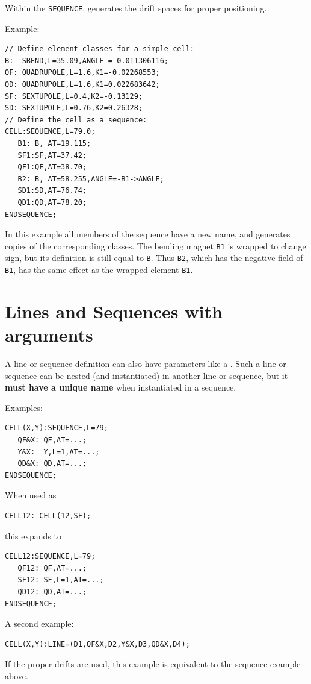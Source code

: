 Within the \texttt{SEQUENCE}, 
\opal generates the drift spaces for proper positioning.

Example:
\begin{verbatim}
// Define element classes for a simple cell:
B:  SBEND,L=35.09,ANGLE = 0.011306116;
QF: QUADRUPOLE,L=1.6,K1=-0.02268553;
QD: QUADRUPOLE,L=1.6,K1=0.022683642;
SF: SEXTUPOLE,L=0.4,K2=-0.13129;
SD: SEXTUPOLE,L=0.76,K2=0.26328;
// Define the cell as a sequence:
CELL:SEQUENCE,L=79.0;
   B1: B, AT=19.115;
   SF1:SF,AT=37.42;
   QF1:QF,AT=38.70;
   B2: B, AT=58.255,ANGLE=-B1->ANGLE;
   SD1:SD,AT=76.74;
   QD1:QD,AT=78.20;
ENDSEQUENCE;
\end{verbatim}
In this example all members of the sequence have a new name,
and \opal generates copies of the corresponding classes.
The bending magnet \texttt{B1} is wrapped to change sign,
but its definition is still equal to \texttt{B}.
Thus \texttt{B2}, which has the negative field of \texttt{B1},
has the same effect as the wrapped element \texttt{B1}.

\section{Lines and Sequences with arguments}
A line or sequence definition can also have parameters like a
.
Such a line or sequence can be nested (and instantiated) in another
line or sequence, but it \textbf{must have a unique name} when
instantiated in a sequence. 
\par
Examples:
\begin{verbatim}
CELL(X,Y):SEQUENCE,L=79;
   QF&X: QF,AT=...;            
   Y&X:  Y,L=1,AT=...;
   QD&X: QD,AT=...;
ENDSEQUENCE;
\end{verbatim}
When used as
\begin{verbatim}
CELL12: CELL(12,SF);
\end{verbatim}
this expands to
\begin{verbatim}
CELL12:SEQUENCE,L=79;
   QF12: QF,AT=...;            
   SF12: SF,L=1,AT=...;
   QD12: QD,AT=...;
ENDSEQUENCE;
\end{verbatim}
A second example:
\begin{verbatim}
CELL(X,Y):LINE=(D1,QF&X,D2,Y&X,D3,QD&X,D4);
\end{verbatim}
If the proper drifts are used, this example is equivalent to
the sequence example above.

